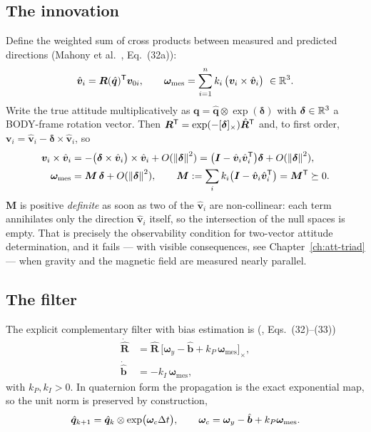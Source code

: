\subsection{The innovation}
Define the weighted sum of cross products between measured and predicted directions
(Mahony et al.~\cite{mahony2008}, Eq.~(32a)):
\begin{equation}
\hat{\bm{v}}_i = \bm{R}(\hat{\bm{q}})^{\mathsf{T}}\bm{v}_{0i},
\qquad
\bm{\omega}_{\text{mes}} = \sum_{i=1}^{n} k_i\,\big(\bm{v}_i\times\hat{\bm{v}}_i\big)\ \in\mathbb{R}^3 .
\label{eq:mh-wmes}
\end{equation}
Write the true attitude multiplicatively as $\bm{q}=\hat{\bm{q}}\otimes\exp(\bm{\delta})$ with
$\bm{\delta}\in\mathbb{R}^3$ a BODY-frame rotation vector. Then
$\bm{R}^{\mathsf{T}} = \exp(-[\bm{\delta}]_\times)\hat{\bm{R}}^{\mathsf{T}}$ and, to first order,
$\bm{v}_i = \hat{\bm{v}}_i-\bm{\delta}\times\hat{\bm{v}}_i$, so
\begin{align}
\bm{v}_i\times\hat{\bm{v}}_i
 &= -\big(\bm{\delta}\times\hat{\bm{v}}_i\big)\times\hat{\bm{v}}_i + O(\left\lVert \bm{\delta} \right\rVert^2)
  = \big(\bm{I}-\hat{\bm{v}}_i\hat{\bm{v}}_i^{\mathsf{T}}\big)\bm{\delta} + O(\left\lVert \bm{\delta} \right\rVert^2),\nonumber\\
\bm{\omega}_{\text{mes}} &= \bm{M}\,\bm{\delta} + O(\left\lVert \bm{\delta} \right\rVert^2),
\qquad
\bm{M} := \sum_i k_i\big(\bm{I}-\hat{\bm{v}}_i\hat{\bm{v}}_i^{\mathsf{T}}\big) = \bm{M}^{\mathsf{T}}\succeq0 .
\label{eq:mh-lin}
\end{align}
$\bm{M}$ is positive \emph{definite} as soon as two of the $\hat{\bm{v}}_i$ are non-collinear: each
term annihilates only the direction $\hat{\bm{v}}_i$ itself, so the intersection of the null spaces
is empty. That is precisely the observability condition for two-vector attitude determination, and
it fails --- with visible consequences, see Chapter~\ref{ch:att-triad} --- when gravity and the
magnetic field are measured nearly parallel.

\subsection{The filter}
The explicit complementary filter with bias estimation is (\cite{mahony2008}, Eqs.~(32)--(33))
\begin{align}
\dot{\hat{\bm{R}}} &= \hat{\bm{R}}\,\big[\bm{\omega}_y-\hat{\bm{b}}+k_P\,\bm{\omega}_{\text{mes}}\big]_\times ,
 \label{eq:mh-R}\\
\dot{\hat{\bm{b}}} &= -k_I\,\bm{\omega}_{\text{mes}} ,
 \label{eq:mh-b}
\end{align}
with $k_P,k_I>0$. In quaternion form the propagation is the exact exponential map, so the unit norm
is preserved by construction,
\begin{equation}
\hat{\bm{q}}_{k+1} = \hat{\bm{q}}_k\otimes\exp\!\big(\bm{\omega}_c\Delta t\big),
\qquad \bm{\omega}_c = \bm{\omega}_y-\hat{\bm{b}}+k_P\bm{\omega}_{\text{mes}} .
\label{eq:mh-prop}
\end{equation}

